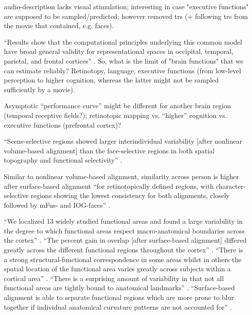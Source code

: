 


%
audio-description lacks visual stimulation; interesting in case "executive
functions" are supposed to be sampled/predicted;
%
however \citet{haxby2011common} removed \acp{tr} (+ following \acp{tr} from the
movie that contained, e.g. faces).

``Results show that the computational principles underlying this common model
have broad general validity for representational spaces in occipital, temporal,
parietal, and frontal cortices'' \citep{guntupalli2016model}.
%
So, what is the limit of "brain functions" that we can estimate reliably?
%
Retinotopy, language, executive functions (from low-level perception to higher
cognition, whereas the latter might not be sampled sufficiently by a movie).

%
Asymptotic ``performance curve'' might be different for another brain region
(temporal receptive fields?); retinotopic mapping vs. ``higher'' cognition  vs.
executive functions (prefrontal cortex)?

``Scene-selective regions showed larger interindividual variability [after
nonlinear volume-based alignment] than the face-selective regions in both
spatial topography and functional selectivity'' \citet{zhen2017quantifying}.


Similar to nonlinear volume-based alignment, similarity across person is higher
after surface-based alignment ``for retinotopically defined regions, with
character-selective regions showing the lowest consistency for both alignments,
closely followed by mFus- and IOG-faces'' \citep{rosenke2021probabilistic}.

%
``We localized 13 widely studied functional areas and found a large variability
in the degree to which functional areas respect macro-anatomical boundaries
across the cortex'' \citep{frost2012measuring}.
%
``The percent gain in overlap [after surface-based alignment] differed greatly
across the different functional regions throughout the cortex''
\citep{frost2012measuring}.
%
``There is a strong structural-functional correspondence in some areas whilst in
others the spatial location of the functional area varies greatly across
subjects within a cortical area'' \citep{frost2012measuring}.
%
``There is a surprising amount of variability in that not all functional areas
are tightly bound to anatomical landmarks'' \citep{frost2012measuring}.
%
``Surface-based alignment is able to separate functional regions which are more
prone to blur together if individual anatomical curvature patterns are not
accounted for'' \citep{frost2012measuring}.

